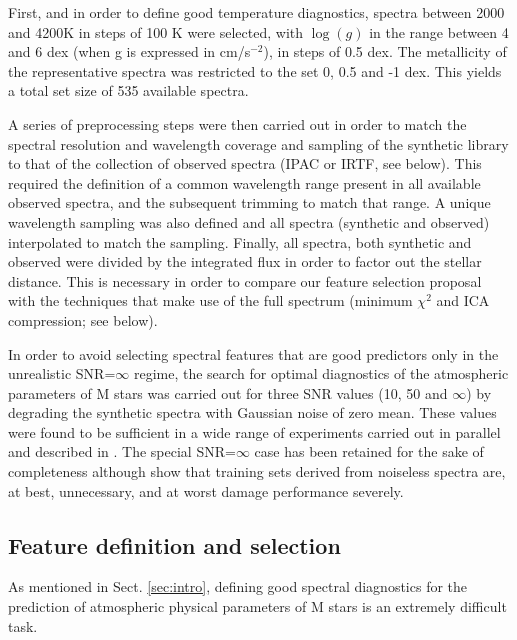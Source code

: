 First, and in order to define good temperature diagnostics, spectra
between 2000 and 4200K in steps of 100 K were selected, with $\log(g)$
in the range between 4 and 6 dex (when g is expressed in cm/s$^{-2}$),
in steps of 0.5 dex. The metallicity of the representative spectra was
restricted to the set 0, 0.5 and -1 dex.  This yields a total set size
of 535 available spectra.

A series of preprocessing steps were then carried out in order to
match the spectral resolution and wavelength coverage and sampling of
the synthetic library to that of the collection of observed spectra
(IPAC or IRTF, see below). This required the definition of a common
wavelength range present in all available observed spectra, and the
subsequent trimming to match that range. A unique wavelength sampling
was also defined and all spectra (synthetic and observed) interpolated
to match the sampling. Finally, all spectra, both synthetic and
observed were divided by the integrated flux in order to factor out
the stellar distance. This is necessary in order to compare our
feature selection proposal with the techniques that make use of the
full spectrum (minimum $\chi^2$ and ICA compression; see below).

In order to avoid selecting spectral features that are good predictors
only in the unrealistic SNR=$\infty$ regime, the search for optimal
diagnostics of the atmospheric parameters of M stars was carried out
for three SNR values (10, 50 and $\infty$) by degrading the synthetic
spectra with Gaussian noise of zero mean. These values were found to
be sufficient in a wide range of experiments carried out in parallel
and described in \cite{2017MNRAS.465.4556G}. The special SNR=$\infty$
case has been retained for the sake of completeness
although \cite{2017MNRAS.465.4556G} show that training sets derived
from noiseless spectra are, at best, unnecessary, and at worst damage
performance severely.

\subsection{Feature definition and selection}
\label{subsec:FD}

As mentioned in Sect. \ref{sec:intro}, defining good spectral
diagnostics for the prediction of atmospheric physical parameters of M
stars is an extremely difficult task.

